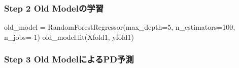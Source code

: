 \documentclass[11pt]{jsarticle}
\newenvironment{Shaded}{}{}
\newcommand{\DecValTok}[1]{\textcolor[rgb]{0.25,0.63,0.44}{{#1}}}
\newcommand{\NormalTok}[1]{{#1}}
\newcommand{\OperatorTok}[1]{\textcolor[rgb]{0.40,0.40,0.40}{{#1}}}
\begin{document}
    \subsubsection{Step 2 Old
Modelの学習}\label{step-2-old-modelux306eux5b66ux7fd2}

    \begin{Shaded}
\begin{Highlighting}[]
\NormalTok{old_model }\OperatorTok{=}\NormalTok{ RandomForestRegressor(max_depth}\OperatorTok{=}\DecValTok{5}\NormalTok{, n_estimators}\OperatorTok{=}\DecValTok{100}\NormalTok{, n_jobs}\OperatorTok{=-}\DecValTok{1}\NormalTok{)}
\NormalTok{old_model.fit(Xfold1, yfold1)}
\end{Highlighting}
\end{Shaded}

    \subsubsection{Step 3 Old
ModelによるPD予測}\label{step-3-old-modelux306bux3088ux308bpdux4e88ux6e2c}
\end{document}
